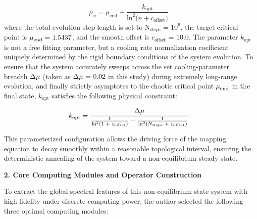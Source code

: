 \documentclass[mca,article,submit,oneauthor,pdftex]{Definitions/mdpi}
\begin{document}
\begin{equation}
{\ensuremath{\mu}}_{{n}}={\ensuremath{\mu}}_{\text{end}}+\frac{{k}_{\text{opt}}}{\text{ln}^{\text{2}}{(}{n}+{c}_{\text{offset}}{)}}
\end{equation}
where the total evolution step length is set to
\(\text{N}_{\text{steps}}\text{ = }\text{10}^{\text{6}}\), the target
critical point is \(\text{\ensuremath{\mu}}_{\text{end}}\text{ = 1.5437}\), and the
smooth offset is \({c}_{\text{offset}}\text{ = 10.0}\). The parameter
\({k}_{\text{opt}}\) is not a free fitting parameter, but a cooling
rate normalization coefficient uniquely determined by the rigid boundary
conditions of the system evolution. To ensure that the system accurately
sweeps across the set cooling-parameter breadth \(\text{\ensuremath{\Delta}}\text{\ensuremath{\mu}}\)
(taken as \(\text{\ensuremath{\Delta}}\text{\ensuremath{\mu}}\text{ = 0.02}\) in this study) during
extremely long-range evolution, and finally strictly asymptotes to the
chaotic critical point \(\text{\ensuremath{\mu}}_{\text{end}}\) in the final state,
\({k}_{\text{opt}}\) satisfies the following physical constraint:

\begin{equation}
{k}_{\text{opt}}=\frac{\text{\ensuremath{\Delta}}\text{\ensuremath{\mu}}}{\frac{\text{1}}{\text{ln}^{\text{2}}\text{(1 + }{c}_{\text{offset}}\text{)}}-\frac{\text{1}}{\text{ln}^{\text{2}}\text{(}{N}_{\text{steps}}\text{ + }{c}_{\text{offset}}\text{)}}}
\end{equation}

This parameterized configuration allows the driving force of the mapping
equation to decay smoothly within a reasonable topological interval,
ensuring the deterministic annealing of the system toward a
non-equilibrium steady state.

\textbf{2. Core Computing Modules and Operator Construction}

To extract the global spectral features of this non-equilibrium state
system with high fidelity under discrete computing power, the author selected
the following three optimal computing modules:
\end{document}
